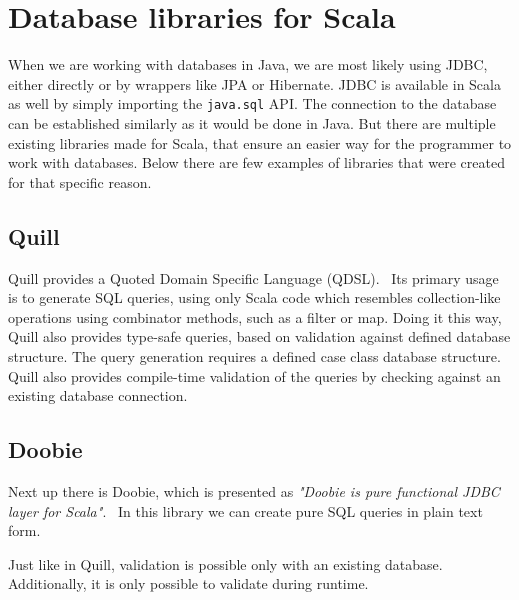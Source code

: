 \section{Database libraries for Scala}
When we are working with databases in Java, we are most likely using JDBC, either directly or by wrappers like JPA or Hibernate. JDBC is available in Scala as well by simply importing the \texttt{java.sql} API. The connection to the database can be established similarly as it would be done in Java. But there are multiple existing libraries made for Scala, that ensure an easier way for the programmer to work with databases. Below there are few examples of libraries that were created for that specific reason.

\subsection{Quill}
Quill provides a Quoted Domain Specific Language (QDSL).~\cite{Quill} Its primary usage is to generate SQL queries, using only Scala code which resembles collection-like operations using combinator methods, such as a filter or map. Doing it this way, Quill also provides type-safe queries, based on validation against defined database structure. The query generation requires a defined case class database structure. Quill also provides compile-time validation of the queries by checking against an existing database connection.

\subsection{Doobie}
Next up there is Doobie, which is presented as \textit{"Doobie is pure functional JDBC layer for Scala"}.~\cite{Doobie} In this library we can create pure SQL queries in plain text form. 

Just like in Quill, validation is possible only with an existing database. Additionally, it is only possible to validate during runtime.

